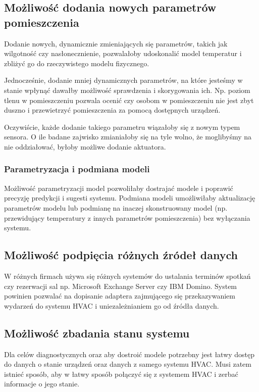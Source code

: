 \subsection*{Możliwość dodania nowych parametrów pomieszczenia}
Dodanie nowych, dynamicznie zmieniających się parametrów, takich jak wilgotność czy nasłonecznienie, pozwalałoby udoskonalić model temperatur i zbliżyć go do rzeczywistego modelu fizycznego.

Jednocześnie, dodanie mniej dynamicznych parametrów, na które jesteśmy w stanie wpłynąć dawałby możliwość sprawdzenia i skorygowania ich. Np. poziom tlenu w pomieszczeniu pozwala ocenić czy osobom w pomieszczeniu nie jest zbyt duszno i przewietrzyć pomieszczenia za pomocą dostępnych urządzeń.

Oczywiście, każde dodanie takiego parametru wiązałoby się z nowym typem sensora. O ile badane zajwisko zmianiałoby się na tyle wolno, że moglibyśmy na nie oddziałować, byłoby możliwe dodanie aktuatora.

\subsubsection*{Parametryzacja i podmiana modeli}
Możliwość parametryzacji model pozwoliłaby dostrajać modele i poprawić precyzję predykcji i sugesti systemu.
Podmiana modeli umożliwiłaby aktualizację parametrów modelu lub podmianę na inaczej skonstruowany model (np. przewidujący temperatury z innych parametrów pomieszczenia) bez wyłączania systemu. 

\subsection*{Możliwość podpięcia różnych źródeł danych}
W różnych firmach używa się różnych systemów do ustalania terminów spotkań czy rezerwacji sal np. Microsoft Exchange Server czy IBM Domino.
System powinien pozwalać na dopisanie adaptera zajmującego się przekazywaniem wydarzeń do systemu HVAC i uniezależnianiem go od źródła danych.

\subsection*{Możliwość zbadania stanu systemu}
Dla celów diagnostycznych oraz aby dostroić modele potrzebny jest łatwy dostęp do danych o stanie urządzeń oraz danych z samego systemu HVAC. Musi zatem istnieć sposób, aby w łatwy sposób połączyć się z systemem HVAC i zerbać informacje o jego stanie.

